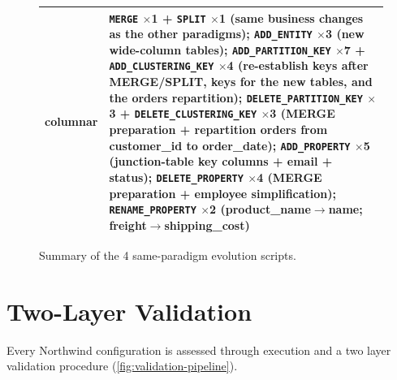 \begin{figure}[t!]
\begin{tabularx}{\textwidth}{@{}p{3.5cm} X@{}}
  columnar
   & \texttt{MERGE} $\times$1 + \texttt{SPLIT} $\times$1 (same business changes as the other paradigms);
     \texttt{ADD\_ENTITY} $\times$3 (new wide-column tables);
     \texttt{ADD\_PARTITION\_KEY} $\times$7 + \texttt{ADD\_CLUSTERING\_KEY} $\times$4 (re-establish keys after MERGE/SPLIT, keys for the new tables, and the orders
  repartition);
     \texttt{DELETE\_PARTITION\_KEY} $\times$3 + \texttt{DELETE\_CLUSTERING\_KEY} $\times$3 (MERGE preparation + repartition orders from customer\_id to order\_date);
     \texttt{ADD\_PROPERTY} $\times$5 (junction-table key columns + email + status);
     \texttt{DELETE\_PROPERTY} $\times$4 (MERGE preparation + employee simplification);
     \texttt{RENAME\_PROPERTY} $\times$2 (product\_name$\to$name; freight$\to$shipping\_cost) \\
  \bottomrule
  \end{tabularx}
  \caption{Summary of the 4 same-paradigm evolution scripts.}
  \label{fig:nw-meta-v2-evolution}
  \end{figure}


  \section{Two-Layer Validation}\label{sec:validation}

  Every Northwind configuration is assessed through execution and a two
  layer validation procedure (\autoref{fig:validation-pipeline}).


